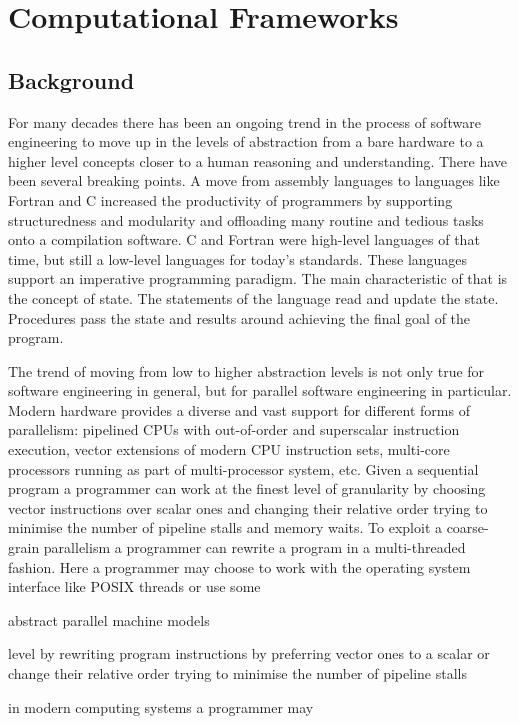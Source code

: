 \chapter{Computational Frameworks}

\section{Background}
\quad For many decades there has been an ongoing trend in the process of software engineering to move up in the levels of abstraction from a bare hardware to a higher level concepts closer to a human reasoning and understanding. There have been several breaking points. A move from assembly languages to languages like Fortran and C increased the productivity of programmers by supporting structuredness and modularity and offloading many routine and tedious tasks onto a compilation software. C and Fortran were high-level languages of that time, but still a low-level languages for today's standards. These languages support an imperative programming paradigm. The main characteristic of that is the concept of state. The statements of the language read and update the state. Procedures pass the state and results around achieving the final goal of the program.   

\quad The trend of moving from low to higher abstraction levels is not only true for software engineering in general, but for parallel software engineering in particular. Modern hardware provides a diverse and vast support for different forms of parallelism: pipelined CPUs with out-of-order and superscalar instruction execution, vector extensions of modern CPU instruction sets, multi-core processors running as part of multi-processor system, etc. Given a sequential program a programmer can work at the finest level of granularity by choosing vector instructions over scalar ones and changing their relative order trying to minimise the number of pipeline stalls and memory waits. To exploit a coarse-grain parallelism a programmer can rewrite a program in a multi-threaded fashion. Here a programmer may choose to work with the operating system interface like POSIX threads or use some 

abstract parallel machine models   


level by rewriting program instructions by preferring vector ones to a scalar or change their relative order trying to minimise the number of pipeline stalls    

in modern computing systems a programmer may 

